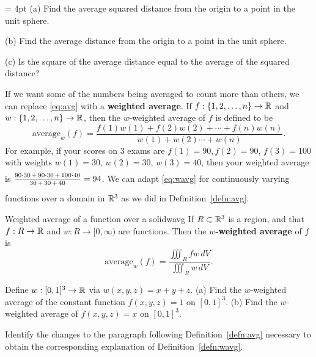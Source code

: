 \documentclass[prettycode,shellescape]{watsonbook}
\begin{document}
\begin{exercise}{}{} \parskip = 4pt
  (a) Find the average squared distance from the origin to a point in
  the unit sphere.

  (b) Find the average distance from the origin to a point in the unit
  sphere.

  (c) Is the square of the average distance equal to the average of
  the squared distance?
\end{exercise}

If we want some of the numbers being averaged to count more than
others, we can replace \eqref{eq:avg} with a \textbf{weighted
  average}. If $f:\{1,2,\ldots,n\} \rightarrow \mathbb{R}$ and
$w:\{1,2,\ldots,n\} \rightarrow \mathbb{R}$, then the $w$-weighted average of
$f$ is defined to be
\begin{equation} \label{eq:wavg} \mathrm{average}_w(f) =
  \frac{f(1)w(1) + f(2)w(2) + \cdots + f(n)w(n)}{w(1)+w(2) \cdots +
    w(n)}.
\end{equation}
For example, if your scores on 3 exams are $f(1)=90, f(2)=90$,
$f(3)=100$ with weights $w(1)=30$, $w(2)=30$, $w(3)=40$, then your
weighted average is
$\rule[-12pt]{0pt}{24pt}\tfrac{\rule[-2pt]{0pt}{12pt} 90\cdot 30 \,+\,
  90\cdot 30 \,+\, 100 \cdot 40}{\rule{0pt}{6pt} 30\,+\,30\,+\,40} = 94$. We
can adapt \eqref{eq:wavg} for continuously varying functions over a
domain in $\mathbb{R}^3$ as we did in Definition~\ref{defn:avg}. 

\begin{defn}{Weighted average of a function over a solid}{wavg}
  If $R\subset \mathbb{R}^3$ is a region, and that $f : R \to \mathbb{R}$ and
  $w : R \to [0,\infty)$ are functions. Then the \textbf{$w$-weighted
    average} of $f$ is
  \[
    \mathrm{average}_w(f) = \frac{\displaystyle{\iiint_R f w\,
        dV}}{\displaystyle{\iiint_R w \, dV}}.
  \]
\end{defn}

\begin{exercise}{}{}
  Define $w : [0,1]^3 \to \mathbb{R}$ via $w(x,y,z) = x+y+z$. (a) Find the
  $w$-weighted average of the constant function $f(x,y,z) = 1$ on
  $[0,1]^3$. (b) Find the $w$-weighted average of $f(x,y,z) = x$ on
  $[0,1]^3$.
\end{exercise}

\begin{exercise}{}{}
  Identify the changes to the paragraph following
  Definition~\ref{defn:avg} necessary to obtain the corresponding
  explanation of Definition~\ref{defn:wavg}.
\end{exercise}
\end{document}
